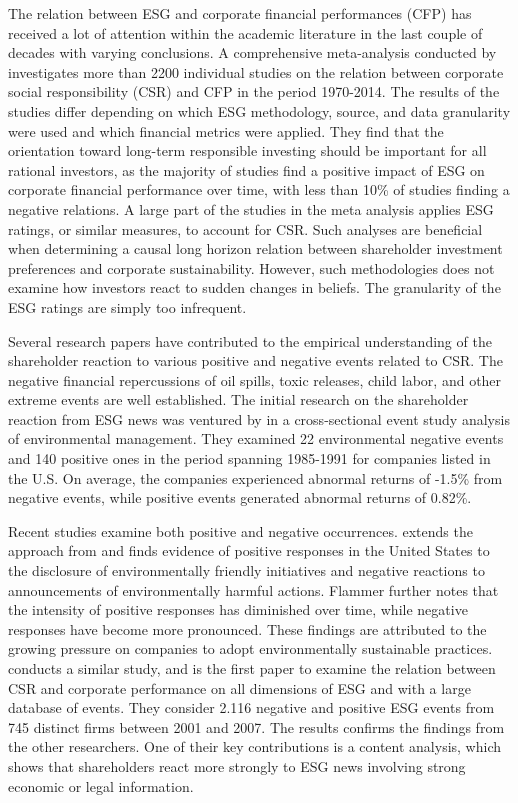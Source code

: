 


The relation between ESG and corporate financial performances (CFP) has received a lot of attention within the academic literature in the last couple of decades with varying conclusions. A comprehensive meta-analysis conducted by \cite{ESG_meta_analysis} investigates more than 2200 individual studies on the relation between corporate social responsibility (CSR) and CFP in the period 1970-2014. The results of the studies differ depending on which ESG methodology, source, and data granularity were used and which financial metrics were applied. They find that the orientation toward long-term responsible investing should be important for all rational investors, as the majority of studies find a positive impact of ESG on corporate financial performance over time, with less than 10\% of studies finding a negative relations. A large part of the studies in the meta analysis applies ESG ratings, or similar measures, to account for CSR. Such analyses are beneficial when determining a causal long horizon relation between shareholder investment preferences and corporate sustainability. However, such methodologies does not examine how investors react to sudden changes in beliefs. The granularity of the ESG ratings are simply too infrequent. 

Several research papers have contributed to the empirical understanding of the shareholder reaction to various positive and negative events related to CSR. The negative financial repercussions of oil spills, toxic releases, child labor, and other extreme events are well established. The initial research on the shareholder reaction from ESG news was ventured by \cite{klassen1996impact} in a cross-sectional event study analysis of environmental management. They examined 22 environmental negative events and 140 positive ones in the period spanning 1985-1991 for companies listed in the U.S. On average, the companies experienced abnormal returns of -1.5\% from negative events, while positive events generated abnormal returns of 0.82\%. 

Recent studies examine both positive and negative occurrences. \cite{flammer2013corporate} extends the approach from \citeauthor{klassen1996impact} and finds evidence of positive responses in the United States to the disclosure of environmentally friendly initiatives and negative reactions to announcements of environmentally harmful actions. Flammer further notes that the intensity of positive responses has diminished over time, while negative responses have become more pronounced. These findings are attributed to the growing pressure on companies to adopt environmentally sustainable practices. \cite{kruger2015corporate} conducts a similar study, and is the first paper to examine the relation between CSR and corporate performance on all dimensions of ESG and with a large database of events. They consider 2.116 negative and positive ESG events from 745 distinct firms between 2001 and 2007. The results confirms the findings from the other researchers. One of their key contributions is a content analysis, which shows that shareholders react more strongly to ESG news involving strong economic or legal information. 

